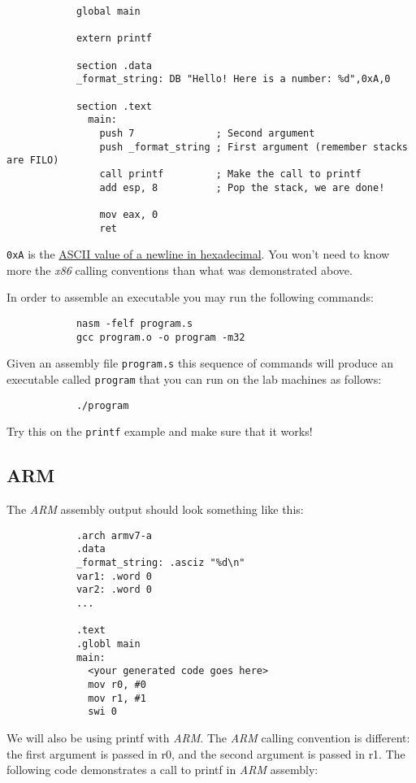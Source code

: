 \documentclass{article}
\newcommand{\code}[1]{\texttt{\textmd{#1}}}
\begin{document}
		\begin{lstlisting}
			global main

			extern printf

			section .data
			_format_string: DB "Hello! Here is a number: %d",0xA,0

			section .text
			  main:
			    push 7              ; Second argument
			    push _format_string ; First argument (remember stacks are FILO)
			    call printf         ; Make the call to printf
			    add esp, 8          ; Pop the stack, we are done!

			    mov eax, 0
			    ret
		\end{lstlisting}

		\texttt{0xA} is the \href{http://www.asciitable.com/}{ASCII value of a newline in hexadecimal}. You won't need
		to know more the \textit{x86} calling conventions than what was demonstrated above.

		In order to assemble an executable you may run the following commands:

		\begin{lstlisting}
			nasm -felf program.s
			gcc program.o -o program -m32
		\end{lstlisting}

		Given an assembly file \texttt{program.s} this sequence of commands will produce an executable called
		\texttt{program} that you can run on the lab machines as follows:

		\begin{lstlisting}
			./program
		\end{lstlisting}

		Try this on the \code{printf} example and make sure that it works!


	\subsection{ARM}

		The \textit{ARM} assembly output should look something like this:

		\begin{lstlisting}
			.arch armv7-a
			.data
			_format_string: .asciz "%d\n"
			var1: .word 0
			var2: .word 0
			...

			.text
			.globl main
			main:
			  <your generated code goes here>
			  mov r0, #0
			  mov r1, #1
			  swi 0
		\end{lstlisting}

		We will also be using printf with \textit{ARM}. The \textit{ARM} calling convention is different: the first
		argument is passed in r0, and the second argument is passed in r1. The following code demonstrates a call to
		printf in \textit{ARM} assembly:
\end{document}
